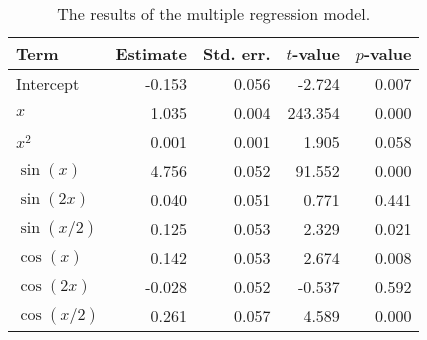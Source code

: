 \begin{table}[t]

\caption{\label{tab:multiple-regression}The results of the multiple regression model.}
\centering
\begin{tabular}{lrrrr}
\toprule
Term & Estimate & Std. err. & \(t\)-value & \(p\)-value\\
\midrule
Intercept & -0.153 & 0.056 & -2.724 & 0.007\\
\(x\) & 1.035 & 0.004 & 243.354 & 0.000\\
\(x^2\) & 0.001 & 0.001 & 1.905 & 0.058\\
\(\sin(x)\) & 4.756 & 0.052 & 91.552 & 0.000\\
\(\sin(2x)\) & 0.040 & 0.051 & 0.771 & 0.441\\
\(\sin(x/2)\) & 0.125 & 0.053 & 2.329 & 0.021\\
\(\cos(x)\) & 0.142 & 0.053 & 2.674 & 0.008\\
\(\cos(2x)\) & -0.028 & 0.052 & -0.537 & 0.592\\
\(\cos(x/2)\) & 0.261 & 0.057 & 4.589 & 0.000\\
\bottomrule
\end{tabular}
\end{table}